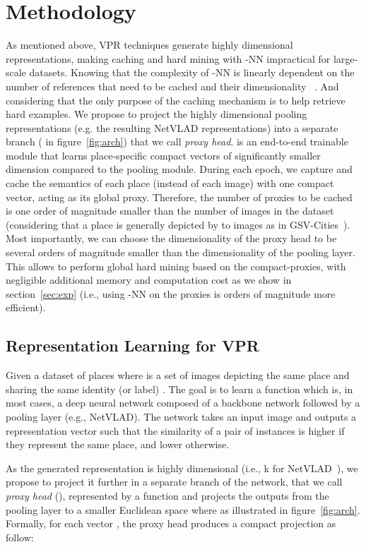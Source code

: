\documentclass{bmvc2k}
\begin{document}
\section{Methodology}
\label{sec:method}
As mentioned above, VPR techniques generate highly dimensional representations, making caching and hard mining with -NN impractical for large-scale datasets. Knowing that the complexity of -NN is linearly  dependent on the number of references  that need to be cached and their dimensionality ~\cite{cunningham2021k}. And considering that the only purpose of the caching mechanism is to help retrieve hard examples. We propose to project the highly dimensional pooling representations (e.g. the resulting NetVLAD representations) into a separate branch ( in figure~\ref{fig:arch}) that we call \textit{proxy head}.  is an end-to-end trainable module that learns place-specific compact vectors of significantly smaller dimension compared to the pooling module. During each epoch, we capture and cache the semantics of each place (instead of each image) with one compact vector, acting as its global proxy. Therefore, the number of proxies to be cached is one order of magnitude smaller than the number of images in the dataset (considering that a place is generally depicted by  to  images as in GSV-Cities~\cite{ali2022gsv}). Most importantly, we can choose  the dimensionality of the proxy head  to be several orders of magnitude smaller than  the dimensionality of the pooling layer. This allows to perform global hard mining based on the compact-proxies, with negligible additional memory and computation cost as we show in section~\ref{sec:exp} (i.e., using -NN on the proxies is orders of magnitude more efficient).

\subsection{Representation Learning for VPR}
Given a dataset of places  where  is a set of images depicting the same place and sharing the same identity (or label) . The goal is to learn a function  which is, in most cases, a deep neural network composed of a backbone network followed by a pooling layer (e.g., NetVLAD). The network  takes an input image  and outputs a representation vector  such that the similarity of a pair of instances  is higher if they represent the same place, and lower otherwise.

As the generated representation  is highly dimensional (i.e., k for NetVLAD~\cite{arandjelovic2016netvlad}), we propose to project it further in a separate branch of the network, that we call \textit{proxy head} (), represented by a function  and projects the outputs from the pooling layer to a smaller Euclidean space where  as illustrated in figure~\ref{fig:arch}. Formally, for each  vector , the proxy head produces a compact projection  as follow:
\end{document}
